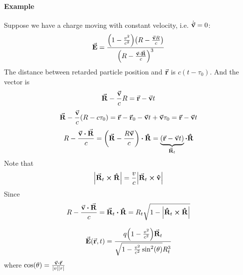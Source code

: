 \paragraph{Example}
Suppose we have a charge moving with constant velocity, i.e. $\dot{\va{v}} = 0$:
$$\va{E} = \frac{\qty(1-\frac{v^2}{c^2}) \qty(R - \frac{\va{v} R }{c})}{\qty(R - \frac{\va{v} \vdot \va{R} }{c})^3}$$
The distance between retarded particle position and $\va{r}$ is $c(t-\tau_0)$. And the vector is
$$\va{R} - \frac{\va{v}}{c} R = \va{r}-\va{v}t$$
$$\va{R} - \frac{\va{v}}{c} (R-c\tau_0)= \va{r}-\va{r}_0 - \va{v} t + \va{v} \tau_0 = \va{r} - \va{v}t$$
$$R - \frac{\va{v}\vdot \va{R}}{c} = \qty(\va{R}- \frac{R\va{v}}{c})\vdot \vu{R} = \underbrace{\qty(\va{r} -\va{v} t)}_{\va{R}_t} \vdot \vu{R}$$
Note that
$$\abs{\va{R}_t \cross \vu{R} } = \frac{v}{c} \abs{\va{R}_t \cross \vu{v}}$$
Since
$$R - \frac{\va{v} \vdot \va{R}}{c} = \va{R}_t \vdot \vu{R}  =R_t \sqrt{1-\abs{\vu{R}_t \cross \vu{R}}} $$

$$\va{E}(\va{r},t) = \frac{q\qty(1-\frac{v^2}{c^2})\va{R}_t}{\sqrt{1-\frac{v^2}{c^2}\sin[2](\theta)}R_t^3}$$
where $\cos(\theta) = \frac{\va{v} \vdot \va{r}}{\abs{v}\abs{r}} $
